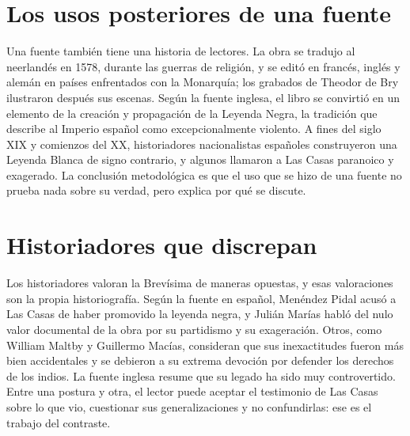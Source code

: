 \documentclass{book}
\begin{document}

\section{Los usos posteriores de una fuente}

Una fuente también tiene una historia de lectores. La obra se tradujo al neerlandés en 1578, durante las guerras de religión, y se editó en francés, inglés y alemán en países enfrentados con la Monarquía; los grabados de Theodor de Bry ilustraron después sus escenas. Según la fuente inglesa, el libro se convirtió en un elemento de la creación y propagación de la Leyenda Negra, la tradición que describe al Imperio español como excepcionalmente violento. A fines del siglo XIX y comienzos del XX, historiadores nacionalistas españoles construyeron una Leyenda Blanca de signo contrario, y algunos llamaron a Las Casas paranoico y exagerado. La conclusión metodológica es que el uso que se hizo de una fuente no prueba nada sobre su verdad, pero explica por qué se discute.


\section{Historiadores que discrepan}

Los historiadores valoran la Brevísima de maneras opuestas, y esas valoraciones son la propia historiografía. Según la fuente en español, Menéndez Pidal acusó a Las Casas de haber promovido la leyenda negra, y Julián Marías habló del nulo valor documental de la obra por su partidismo y su exageración. Otros, como William Maltby y Guillermo Macías, consideran que sus inexactitudes fueron más bien accidentales y se debieron a su extrema devoción por defender los derechos de los indios. La fuente inglesa resume que su legado ha sido muy controvertido. Entre una postura y otra, el lector puede aceptar el testimonio de Las Casas sobre lo que vio, cuestionar sus generalizaciones y no confundirlas: ese es el trabajo del contraste.

\end{document}
